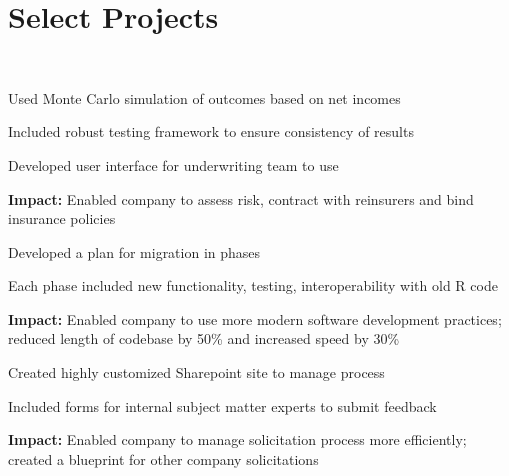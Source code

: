 \documentclass[]{deedy-resume-openfont}
\begin{document}
\begin{minipage}[t]{0.33\textwidth}



\section{Select Projects}
\\
\vspace{\topsep}
\begin{tightemize}
\item Used Monte Carlo simulation of outcomes based on net incomes
\item Included robust testing framework to ensure consistency of results
\item Developed user interface for underwriting team to use
\end{tightemize}
{\bf Impact: } Enabled company to assess risk, contract with reinsurers and bind insurance policies
\\[6pt]
\begin{tightemize}
\item Developed a plan for migration in phases
\item Each phase included new functionality, testing, interoperability with old R code
\end{tightemize}
{\bf Impact: } Enabled company to use more modern software development practices; reduced length of codebase by 50\% and increased speed by 30\%
\\[6pt]
\begin{tightemize}
\item Created highly customized Sharepoint site to manage process
\item Included forms for internal subject matter experts to submit feedback
\end{tightemize}
{\bf Impact: } Enabled company to manage solicitation process more efficiently; created a blueprint for other company solicitations

\end{minipage} 
\end{document}
